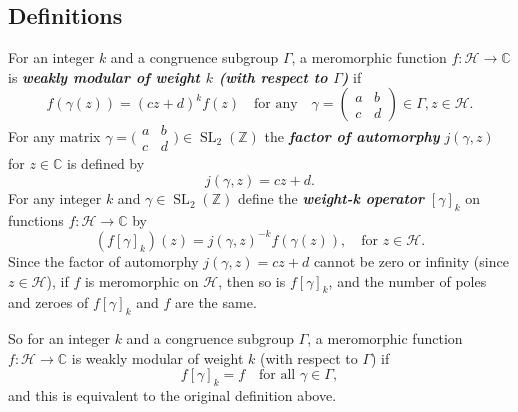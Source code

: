 \documentclass[10pt,leqno]{article}
\theoremstyle{plain}
\theoremstyle{definition}
\numberwithin{equation}{section}
\numberwithin{lem}{section}
\newcommand{\textib}[1]{\textbf{\textit{#1}}}
\DeclareMathOperator{\SL}{SL}
\begin{document}
\subsection{Definitions}
For an integer $k$ and a congruence subgroup $\varGamma$, a meromorphic function $f\colon \mathcal H\to \mathbb{C}$ is \textib{weakly modular of weight $k$ (with respect to $\varGamma$)} if \[f(\gamma(z)) = (cz+d)^kf(z)\quad\text{for any}\quad \gamma = \begin{pmatrix}
    a & b \\ c & d
\end{pmatrix}\in \varGamma, z\in \mathcal H.\]
For any matrix $\gamma=\big(\!\begin{smallmatrix}
    a & b \\ c & d
\end{smallmatrix}\!\big)\in \SL_2(\mathbb{Z})$ the \textib{factor of automorphy} $j(\gamma,z)$ for $z\in \mathbb{C}$ is defined by \[j(\gamma,z) = cz+d.\] For any integer $k$ and $\gamma\in \SL_2(\mathbb{Z})$ define the \textib{weight-k operator} $[\gamma]_k$ on functions $f\colon \mathcal H\to \mathbb{C}$ by \[(f[\gamma]_k)(z) = j(\gamma,z)^{-k}f(\gamma(z)),\quad\text{for } z\in \mathcal H.\]
Since the factor of automorphy $j(\gamma,z) = cz+d$ cannot be zero or infinity (since $z\in \mathcal H$), if $f$ is meromorphic on $\mathcal H$, then so is $f[\gamma]_k$, and the number of poles and zeroes of $f[\gamma]_k$ and $f$ are the same.

So for an integer $k$ and a congruence subgroup $\varGamma$, a meromorphic function $f\colon \mathcal H \to \mathbb{C}$ is weakly modular of weight $k$ (with respect to $\varGamma$) if \[f[\gamma]_k = f\quad\text{for all }\gamma\in \varGamma,\] and this is equivalent to the original definition above.
\end{document}
